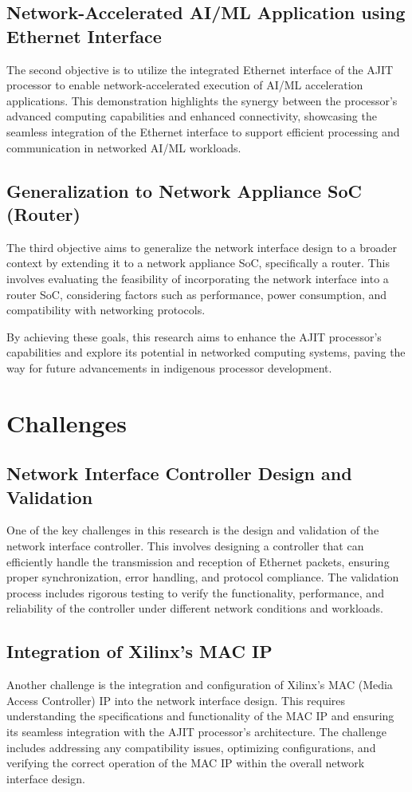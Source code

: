\documentclass[12pt]{report}
\begin{document}
		\subsection{Network-Accelerated AI/ML Application using Ethernet Interface}
			The second objective is to utilize the integrated Ethernet interface of the AJIT processor to enable network-accelerated execution of AI/ML acceleration applications. This demonstration highlights the synergy between the processor's advanced computing capabilities and enhanced connectivity, showcasing the seamless integration of the Ethernet interface to support efficient processing and communication in networked AI/ML workloads.

		\subsection{Generalization to Network Appliance SoC (Router)}
			The third objective aims to generalize the network interface design to a broader context by extending it to a network appliance SoC, specifically a router. This involves evaluating the feasibility of incorporating the network interface into a router SoC, considering factors such as performance, power consumption, and compatibility with networking protocols.

By achieving these goals, this research aims to enhance the AJIT processor's capabilities and explore its potential in networked computing systems, paving the way for future advancements in indigenous processor development.

	\section{Challenges}

		\subsection{Network Interface Controller Design and Validation}
   One of the key challenges in this research is the design and validation of the network interface controller. This involves designing a controller that can efficiently handle the transmission and reception of Ethernet packets, ensuring proper synchronization, error handling, and protocol compliance. The validation process includes rigorous testing to verify the functionality, performance, and reliability of the controller under different network conditions and workloads.

		\subsection{Integration of Xilinx's MAC IP}
   Another challenge is the integration and configuration of Xilinx's MAC (Media Access Controller) IP into the network interface design. This requires understanding the specifications and functionality of the MAC IP and ensuring its seamless integration with the AJIT processor's architecture. The challenge includes addressing any compatibility issues, optimizing configurations, and verifying the correct operation of the MAC IP within the overall network interface design.
\end{document}
